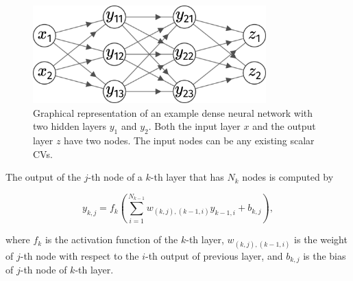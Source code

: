 \begin{figure}[!ht]
	\centering
	\ifdefined{}\else\includegraphics[width=9cm]{dense_nn}\fi
	\caption[Graphical representation of an example dense neural network.]{Graphical representation of an example dense neural network with two hidden layers $y_1$ and $y_2$. Both the input layer $x$ and the output layer $z$ have two nodes. The input nodes can be any existing scalar CVs.
	}
	\label{fig:dense_nn}
\end{figure}

The output of the $j$-th node of a $k$-th layer that has $N_k$ nodes is computed by

\begin{equation}
y_{k,j}=f_{k}\left(\sum_{i=1}^{N_{k-1}} w_{(k,j),(k-1,i)} y_{k-1,i} + b_{k,j}\right),
\end{equation}

where $f_{k}$ is the activation function of the $k$-th layer, $w_{(k,j),(k-1,i)}$ is the weight of $j$-th node with respect to the $i$-th output of previous layer, and $b_{k,j}$ is the bias of $j$-th node of $k$-th layer.


